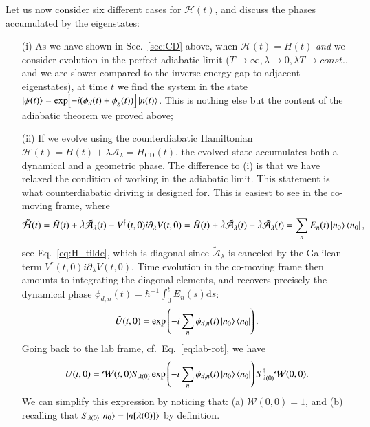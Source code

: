Let us now consider six different cases for $\mathcal{H}(t)$, and discuss the phases accumulated by the eigenstates:
\begin{enumerate}
    \item[(i)] As we have shown in Sec.~\ref{sec:CD} above, when $\mathcal{H}(t)=H(t)$ \textit{and} we consider evolution in the perfect adiabatic limit ($T\to\infty, \dot\lambda\to 0, \dot\lambda T \to const.$, and we are slower compared to the inverse energy gap to adjacent eigenstates), at time $t$ we find the system in the state $\ket{\psi(t)}=\exp[-i(\phi_d(t)+\phi_g(t))]\ket{n(t)}$. This is nothing else but the content of the adiabatic theorem we proved above;

    \item[(ii)] If we evolve using the counterdiabatic Hamiltonian $\mathcal{H}(t)=H(t)+\dot\lambda\mathcal{A}_\lambda=H_\text{CD}(t)$, the evolved state accumulates both a dynamical and a geometric phase. The difference to (i) is that we have relaxed the condition of working in the adiabatic limit. This statement is what counterdiabatic driving is designed for. 
    This is easiest to see in the co-moving frame, where 
    \begin{equation}
        \tilde{\mathcal H}(t)=\tilde H(t) +\dot\lambda \tilde{\mathcal{A}}_\lambda(t) - V^\dagger(t,0)i\partial_\lambda V(t,0) = \tilde H(t) +\dot\lambda \tilde{\mathcal{A}}_\lambda(t) - \dot\lambda \tilde{\mathcal{A}}_\lambda(t) = \sum_n E_n(t)\ket{n_0}\bra{n_0},
    \end{equation}
    see Eq.~\eqref{eq:H_tilde}, which is diagonal since $\tilde{\mathcal{A}}_\lambda$ is canceled by the Galilean term $V^\dagger(t,0)i\partial_\lambda V(t,0)$.
    Time evolution in the co-moving frame then amounts to integrating the diagonal elements, and recovers precisely the dynamical phase $\phi_{d,n}(t)=\hbar^{-1}\int^t_0 E_n(s)\mathrm d s$:
    \begin{equation}
        \tilde U(t,0) = \exp\left( -i \sum_n \phi_{d,n}(t) \ket{n_0}\bra{n_0} \right).
    \end{equation}
    Going back to the lab frame, cf.~Eq.~\eqref{eq:lab-rot}, we have
    \begin{equation}
        U(t,0) = \mathcal{W}(t,0)S_{\lambda(0)}\exp\left( -i \sum_n \phi_{d,n}(t) \ket{n_0}\bra{n_0} \right) S^\dagger_{\lambda(0)} \mathcal{W}(0,0).
    \end{equation}
    We can simplify this expression by noticing that: 
    (a) $\mathcal{W}(0,0)=1$, and
    (b) recalling that $S_{\lambda(0)}\ket{n_0} = \ket{n[\lambda(0)]}$ by definition.

\end{enumerate}
